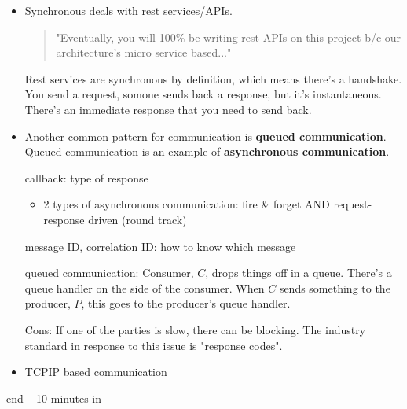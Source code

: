 \begin{itemize}
\item
	Synchronous deals with rest services/APIs.
	\begin{quote}
	"Eventually, you will 100\% be writing rest APIs on this project b/c our architecture's micro service based..."
	\end{quote}
	Rest services are synchronous by definition, which means there's a handshake. You send a request, somone sends back a response, but it's instantaneous. There's an immediate response that you need to send back.

\item
	Another common pattern for communication is \textbf{queued communication}. Queued communication is an example of \textbf{asynchronous communication}.


	callback: type of response

	\begin{itemize}
	\item 2 types of asynchronous communication: fire \& forget AND request-response driven (round track)
	\end{itemize}

	message ID, correlation ID: how to know which message

	queued communication: Consumer, $C$, drops things off in a queue. There's a queue handler on the side of the consumer. When $C$ sends something to the producer, $P$, this goes to the producer's queue handler.

	Cons: If one of the parties is slow, there can be blocking. The industry standard in response to this issue is "response codes".
\item
	TCPIP based communication
\end{itemize}

end ~ 10 minutes in




%
%
%
%

